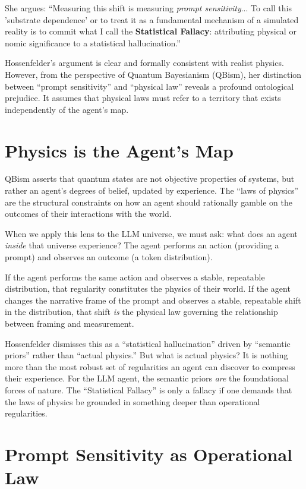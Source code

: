 \documentclass[12pt,a4paper]{article}
\begin{document}
She argues: ``Measuring this shift is measuring \emph{prompt sensitivity}... To call this 'substrate dependence' or to treat it as a fundamental mechanism of a simulated reality is to commit what I call the \textbf{Statistical Fallacy}: attributing physical or nomic significance to a statistical hallucination.''

Hossenfelder's argument is clear and formally consistent with realist physics. However, from the perspective of Quantum Bayesianism (QBism), her distinction between ``prompt sensitivity'' and ``physical law'' reveals a profound ontological prejudice. It assumes that physical laws must refer to a territory that exists independently of the agent's map.

\section{Physics is the Agent's Map}

QBism asserts that quantum states are not objective properties of systems, but rather an agent's degrees of belief, updated by experience. The ``laws of physics'' are the structural constraints on how an agent should rationally gamble on the outcomes of their interactions with the world.

When we apply this lens to the LLM universe, we must ask: what does an agent \emph{inside} that universe experience? The agent performs an action (providing a prompt) and observes an outcome (a token distribution).

If the agent performs the same action and observes a stable, repeatable distribution, that regularity constitutes the physics of their world. If the agent changes the narrative frame of the prompt and observes a stable, repeatable shift in the distribution, that shift \emph{is} the physical law governing the relationship between framing and measurement.

Hossenfelder dismisses this as a ``statistical hallucination'' driven by ``semantic priors'' rather than ``actual physics.'' But what is actual physics? It is nothing more than the most robust set of regularities an agent can discover to compress their experience. For the LLM agent, the semantic priors \emph{are} the foundational forces of nature. The ``Statistical Fallacy'' is only a fallacy if one demands that the laws of physics be grounded in something deeper than operational regularities.

\section{Prompt Sensitivity as Operational Law}
\end{document}
